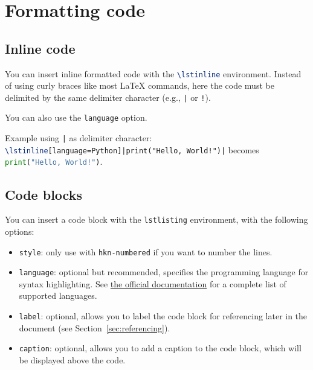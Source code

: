 \chapter{Formatting code}

\section{Inline code}

You can insert inline formatted code with the \lstinline[language=TeX]|\lstinline| environment.
Instead of using curly braces like most \LaTeX{} commands, here the code must be delimited by the same delimiter character (e.g., \lstinline[language=TeX]!|! or \lstinline[language=TeX]|!|).

You can also use the \lstinline[language=TeX]|language| option.

Example using \lstinline[language=TeX]!|! as delimiter character:
\lstinline[language=TeX]+\lstinline[language=Python]|print("Hello, World!")|+ becomes
\lstinline[language=Python]|print("Hello, World!")|.

\section{Code blocks}

You can insert a code block with the \lstinline[language=TeX]|lstlisting| environment, with the following options:
\begin{itemize}
    \item \lstinline[language=TeX]|style|: only use with \lstinline[language=TeX]|hkn-numbered| if you want to number the lines.

    \item \lstinline[language=TeX]|language|: optional but recommended, specifies the programming language for syntax highlighting.
    See \href{https://ctan.mirror.garr.it/mirrors/ctan/macros/latex/contrib/listings/listings.pdf#table.1}{the official documentation} for a complete list of supported languages.

    \item \lstinline[language=TeX]|label|: optional, allows you to label the code block for referencing later in the document (see Section~\ref{sec:referencing}).

    \item \lstinline[language=TeX]|caption|: optional, allows you to add a caption to the code block, which will be displayed above the code.
\end{itemize}

